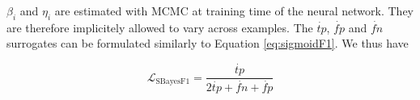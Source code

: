 \(\beta_i\) and \(\eta_i\) are estimated with MCMC at training time of the neural network. They are therefore implicitely allowed to vary across examples. The \(\dot{tp}\), \(\dot{fp}\) and \(\dot{fn}\) surrogates can be formulated similarly to Equation \ref{eq:sigmoidF1}. We thus have

\begin{equation}
\mathcal{L}_{\text {SBayesF1}}= \frac{\dot{tp}}{2 \dot{tp}+ \dot{fn}+ \dot{fp}}
\end{equation}











